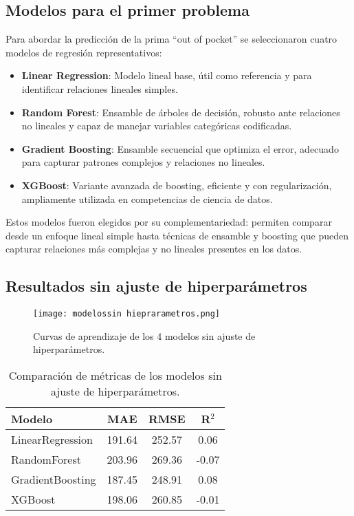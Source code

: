 \documentclass[12pt,a4paper]{article}
\begin{document}
\begin{itemize}
\section*{Modelos para el primer problema}
Para abordar la predicción de la prima ``out of pocket'' se seleccionaron cuatro modelos de regresión representativos:
\begin{itemize}
    \item \textbf{Linear Regression}: Modelo lineal base, útil como referencia y para identificar relaciones lineales simples.
    \item \textbf{Random Forest}: Ensamble de árboles de decisión, robusto ante relaciones no lineales y capaz de manejar variables categóricas codificadas.
    \item \textbf{Gradient Boosting}: Ensamble secuencial que optimiza el error, adecuado para capturar patrones complejos y relaciones no lineales.
    \item \textbf{XGBoost}: Variante avanzada de boosting, eficiente y con regularización, ampliamente utilizada en competencias de ciencia de datos.
\end{itemize}
Estos modelos fueron elegidos por su complementariedad: permiten comparar desde un enfoque lineal simple hasta técnicas de ensamble y boosting que pueden capturar relaciones más complejas y no lineales presentes en los datos.

\subsection*{Resultados sin ajuste de hiperparámetros}
\begin{figure}[H]
    \centering
    \texttt{[image: modelossin hieprarametros.png]}
    \caption{Curvas de aprendizaje de los 4 modelos sin ajuste de hiperparámetros.}
\end{figure}

\begin{table}[H]
\centering
\begin{tabular}{lccc}
\toprule
\textbf{Modelo} & \textbf{MAE} & \textbf{RMSE} & \textbf{R$^2$} \\
\midrule
LinearRegression & 191.64 & 252.57 & 0.06 \\
RandomForest & 203.96 & 269.36 & -0.07 \\
GradientBoosting & 187.45 & 248.91 & 0.08 \\
XGBoost & 198.06 & 260.85 & -0.01 \\
\bottomrule
\end{tabular}
\caption{Comparación de métricas de los modelos sin ajuste de hiperparámetros.}
\end{table}


\end{itemize}
\end{document}
